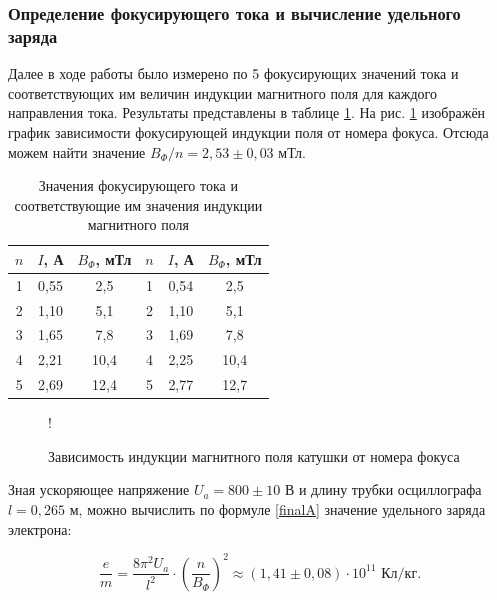 \documentclass[a4paper,12pt]{article} %
\begin{document}
\subsubsection{Определение фокусирующего тока и вычисление удельного заряда}

Далее в ходе работы было измерено по 5 фокусирующих значений тока и соответствующих им величин индукции магнитного поля для каждого направления тока. Результаты представлены в таблице \ref{tab:focuses}. На рис. \ref{graph:focuses} изображён график зависимости фокусирующей индукции поля от номера фокуса. Отсюда можем найти значение $B_\Phi / n = 2,53 \pm 0,03$ мТл.

\begin{table}
\centering
\begin{tabular}{|c|c|c|c|c|c|}
\hline
$n$ & $I$, А & $B_\Phi$, мТл & $n$ & $I$, А & $B_\Phi$, мТл \\ \hline
1 & 0,55 & 2,5 & 1 & 0,54 & 2,5 \\ \hline
2 & 1,10 & 5,1 & 2 & 1,10 & 5,1 \\ \hline
3 & 1,65 & 7,8 & 3 & 1,69 & 7,8 \\ \hline
4 & 2,21 & 10,4 & 4 & 2,25 & 10,4 \\ \hline
5 & 2,69 & 12,4 & 5 & 2,77 & 12,7 \\ \hline
\end{tabular}
\caption{Значения фокусирующего тока и соответствующие им значения индукции магнитного поля}
\label{tab:focuses}
\end{table}

\begin{figure}
\centering
{} {!} {
}
\caption{Зависимость индукции магнитного поля катушки от номера фокуса}
\label{graph:focuses}
\end{figure}

Зная ускоряющее напряжение $U_a = 800 \pm 10$ В и длину трубки осциллографа $l = 0,265$ м, можно вычислить по формуле \eqref{finalA} значение удельного заряда электрона:

\begin{equation}
    \frac{e}{m} = \frac{8\pi^2 U_a}{l^2}\cdot(\frac{n}{B_\Phi})^2 \approx (1,41 \pm 0,08) \cdot 10^{11} \text{ Кл/кг}.
\end{equation}
\end{document}
